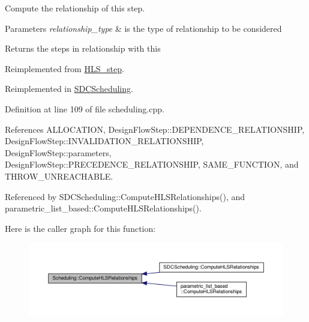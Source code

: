 Compute the relationship of this step. 


\begin{DoxyParams}{Parameters}
{\em relationship\+\_\+type} & is the type of relationship to be considered \\
\hline
\end{DoxyParams}
\begin{DoxyReturn}{Returns}
the steps in relationship with this 
\end{DoxyReturn}


Reimplemented from \hyperlink{classHLS__step_aed0ce8cca9a1ef18e705fc1032ad4de5}{H\+L\+S\+\_\+step}.



Reimplemented in \hyperlink{classSDCScheduling_aec06b6a8117baa3496c1ee294c4341ab}{S\+D\+C\+Scheduling}.



Definition at line 109 of file scheduling.\+cpp.



References A\+L\+L\+O\+C\+A\+T\+I\+ON, Design\+Flow\+Step\+::\+D\+E\+P\+E\+N\+D\+E\+N\+C\+E\+\_\+\+R\+E\+L\+A\+T\+I\+O\+N\+S\+H\+IP, Design\+Flow\+Step\+::\+I\+N\+V\+A\+L\+I\+D\+A\+T\+I\+O\+N\+\_\+\+R\+E\+L\+A\+T\+I\+O\+N\+S\+H\+IP, Design\+Flow\+Step\+::parameters, Design\+Flow\+Step\+::\+P\+R\+E\+C\+E\+D\+E\+N\+C\+E\+\_\+\+R\+E\+L\+A\+T\+I\+O\+N\+S\+H\+IP, S\+A\+M\+E\+\_\+\+F\+U\+N\+C\+T\+I\+ON, and T\+H\+R\+O\+W\+\_\+\+U\+N\+R\+E\+A\+C\+H\+A\+B\+LE.



Referenced by S\+D\+C\+Scheduling\+::\+Compute\+H\+L\+S\+Relationships(), and parametric\+\_\+list\+\_\+based\+::\+Compute\+H\+L\+S\+Relationships().

Here is the caller graph for this function\+:
\nopagebreak
\begin{figure}[H]
\begin{center}
\leavevmode
\includegraphics[width=350pt]{db/d2c/classScheduling_a60e98bfbe377334ea3f3c0de2f2ab758_icgraph}
\end{center}
\end{figure}
\mbox{\label{classScheduling_ada5eff4553c39bf5f6c58e75c86a130b}} 
